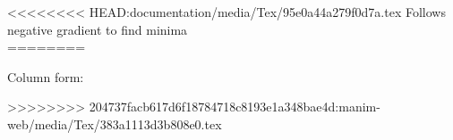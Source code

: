 \documentclass[preview]{standalone}
\begin{document}
<<<<<<<< HEAD:documentation/media/Tex/95e0a44a279f0d7a.tex
Follows negative gradient to find minima\\
========
\begin{center}
Column form:
\end{center}
>>>>>>>> 204737facb617d6f18784718c8193e1a348bae4d:manim-web/media/Tex/383a1113d3b808e0.tex
\end{document}
